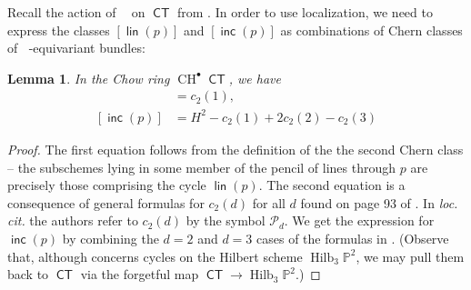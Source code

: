 \documentclass[reqno, 11pt]{amsart}
\theoremstyle{plain}
\newtheorem{proposition}[theorem]{Proposition}
\newtheorem{lemma}[theorem]{Lemma}
\theoremstyle{remark}
\renewcommand{\P}{\mathbb{P}}
\DeclareMathOperator{\Hilb}{Hilb}
\DeclareMathOperator{\CT}{\mathsf{CT}}
\DeclareMathOperator{\Gm}{\mathbb{G}_{m}}
\DeclareMathOperator{\SQP}{\mathsf{SQP}}
\DeclareMathOperator{\CH}{CH}
\DeclareMathOperator{\BP}{\mathsf{Bpt}}
\DeclareMathOperator{\Lin}{\mathsf{Lin}}
\DeclareMathOperator{\Inc}{\mathsf{Inc}}
\DeclareMathOperator{\lin}{\mathsf{lin}}
\DeclareMathOperator{\inc}{\mathsf{inc}}
\begin{document}
Recall the action of $\Gm$ on $\CT$ from . In order to use localization, we need to express the classes $[\lin(p)]$ and $[\inc(p)]$ as combinations of Chern classes of $\Gm$-equivariant bundles:

\begin{lemma}
    \label{lemma:IncLinclasses} In the Chow ring $\CH^{\bullet}\CT$, we have \begin{align}
        [\lin(p)] &= c_{2}(1),\\
        [\inc(p)] &= H^{2} - c_{2}(1) + 2c_{2}(2)-c_{2}(3)
        \end{align}
    \end{lemma}

\begin{proof}
    The first equation follows from the definition of the the second Chern class -- the subschemes lying in some member of the pencil of lines through $p$ are precisely those comprising the cycle $\lin(p)$.  The second equation is a consequence of general formulas for $c_{2}(d)$ for all $d$ found on page 93 of \cite{elencwajg2006explicit}.  In \emph{loc. cit.} the authors refer to $c_{2}(d)$ by the symbol $\mathcal{P}_{d}$.  We get the expression for $\inc(p)$ by combining the $d=2$ and $d=3$ cases of the formulas in \cite{elencwajg2006explicit}. (Observe that, although \cite{elencwajg2006explicit} concerns cycles on the Hilbert scheme $\Hilb_{3}\P^{2}$, we may pull them back to $\CT$ via the forgetful map $\CT \to \Hilb_{3}\P^{2}$.)
\end{proof} 


\end{document}
